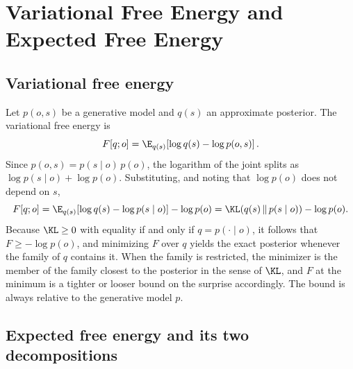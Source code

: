 \chapter{Variational Free Energy and Expected Free Energy}

\section*{Variational free energy}

Let $p(o,s)$ be a generative model and $q(s)$ an approximate posterior. The variational free energy is
\[
F[q;o]=\E_{q(s)}\!\left[\log q(s)-\log p(o,s)\right].
\]
Since $p(o,s)=p(s\mid o)\,p(o)$, the logarithm of the joint splits as $\log p(s\mid o)+\log p(o)$. Substituting, and noting that $\log p(o)$ does not depend on $s$,
\[
F[q;o]=\E_{q(s)}\!\left[\log q(s)-\log p(s\mid o)\right]-\log p(o)=\KL\!\left(q(s)\,\|\,p(s\mid o)\right)-\log p(o).
\]
Because $\KL\ge 0$ with equality if and only if $q=p(\cdot\mid o)$, it follows that $F\ge-\log p(o)$, and minimizing $F$ over $q$ yields the exact posterior whenever the family of $q$ contains it. When the family is restricted, the minimizer is the member of the family closest to the posterior in the sense of $\KL$, and $F$ at the minimum is a tighter or looser bound on the surprise accordingly. The bound is always relative to the generative model $p$.

\section*{Expected free energy and its two decompositions}

